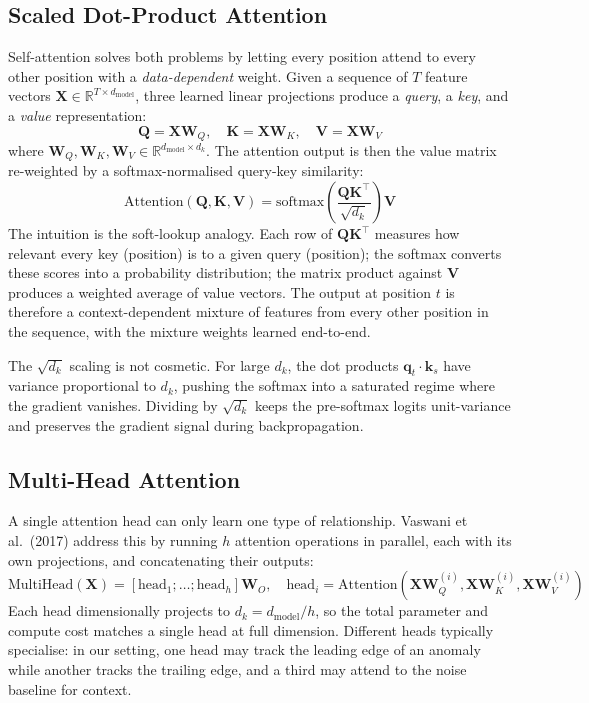 \subsection{Scaled Dot-Product Attention}
Self-attention solves both problems by letting every position attend to every other position with a \textit{data-dependent} weight. Given a sequence of $T$ feature vectors $\mathbf{X} \in \mathbb{R}^{T \times d_{\text{model}}}$, three learned linear projections produce a \textit{query}, a \textit{key}, and a \textit{value} representation:
\begin{equation}
    \mathbf{Q} = \mathbf{X} \mathbf{W}_{Q}, \quad
    \mathbf{K} = \mathbf{X} \mathbf{W}_{K}, \quad
    \mathbf{V} = \mathbf{X} \mathbf{W}_{V}
\end{equation}
where $\mathbf{W}_{Q}, \mathbf{W}_{K}, \mathbf{W}_{V} \in \mathbb{R}^{d_{\text{model}} \times d_{k}}$. The attention output is then the value matrix re-weighted by a softmax-normalised query-key similarity:
\begin{equation}
    \text{Attention}(\mathbf{Q}, \mathbf{K}, \mathbf{V}) = \text{softmax}\!\left( \frac{\mathbf{Q} \mathbf{K}^{\top}}{\sqrt{d_{k}}} \right) \mathbf{V}
\end{equation}
The intuition is the soft-lookup analogy. Each row of $\mathbf{Q} \mathbf{K}^{\top}$ measures how relevant every key (position) is to a given query (position); the softmax converts these scores into a probability distribution; the matrix product against $\mathbf{V}$ produces a weighted average of value vectors. The output at position $t$ is therefore a context-dependent mixture of features from every other position in the sequence, with the mixture weights learned end-to-end.

The $\sqrt{d_{k}}$ scaling is not cosmetic. For large $d_{k}$, the dot products $\mathbf{q}_{t} \cdot \mathbf{k}_{s}$ have variance proportional to $d_{k}$, pushing the softmax into a saturated regime where the gradient vanishes. Dividing by $\sqrt{d_{k}}$ keeps the pre-softmax logits unit-variance and preserves the gradient signal during backpropagation.

\subsection{Multi-Head Attention}
A single attention head can only learn one type of relationship. Vaswani et al.\ (2017) address this by running $h$ attention operations in parallel, each with its own projections, and concatenating their outputs:
\begin{equation}
    \text{MultiHead}(\mathbf{X}) = [\text{head}_{1}; \ldots; \text{head}_{h}] \mathbf{W}_{O}, \quad
    \text{head}_{i} = \text{Attention}(\mathbf{X} \mathbf{W}_{Q}^{(i)}, \mathbf{X} \mathbf{W}_{K}^{(i)}, \mathbf{X} \mathbf{W}_{V}^{(i)})
\end{equation}
Each head dimensionally projects to $d_{k} = d_{\text{model}} / h$, so the total parameter and compute cost matches a single head at full dimension. Different heads typically specialise: in our setting, one head may track the leading edge of an anomaly while another tracks the trailing edge, and a third may attend to the noise baseline for context.

